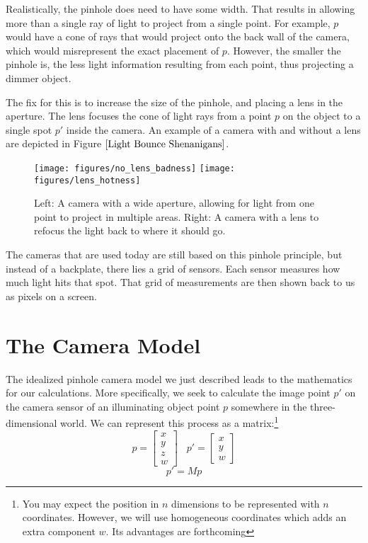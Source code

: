 \documentclass[
    12pt,
    twoside,
    bibstyle=chicago,
    headerstyle=uppercase,
	bibfile=biblatex_updating.bib
]{reedthesis}
\begin{document}
Realistically, the pinhole does need to have some width. That results in allowing more than a single ray of light to project from a single point. For example, $p$ would have a cone of rays that would project onto the back wall of the camera, which would misrepresent the exact placement of $p$. However, the smaller the pinhole is, the less light information resulting from each point, thus projecting a dimmer object.

The fix for this is to increase the size of the pinhole, and placing a lens in the aperture. The lens focuses the cone of light rays from a point $p$ on the object to a single spot $p'$ inside the camera. An example of a camera with and without a lens are depicted in Figure $\ref{Light Bounce Shenanigans}$. 



\begin{figure}[t]
	    \centering
	    \texttt{[image: figures/no\_lens\_badness]}
		\hfill
		\texttt{[image: figures/lens\_hotness]}
	    \caption{Left: A camera with a wide aperture, allowing for light from one point to project in multiple areas. Right: A camera with a lens to refocus the light back to where it should go.}
	\label{Light Bounce Shenanigans}
	\end{figure}


The cameras that are used today are still based on this pinhole principle, but instead of a backplate, there lies a grid of sensors. Each sensor measures how much light hits that spot. That grid of measurements are then shown back to us as pixels on a screen.


\section{The Camera Model}

The idealized pinhole camera model we just described leads to the mathematics for our calculations. More specifically, we seek to calculate the image point $p'$ on the camera sensor of an illuminating object point $p$ somewhere in the three-dimensional world. We can represent this process as a matrix:\footnote{You may expect the position in $n$ dimensions to be represented with $n$ coordinates. However, we will use homogeneous coordinates which adds an extra component $w$. Its advantages are forthcoming}
\[p = \left[\begin{smallmatrix}
	x\\y\\z\\w
\end{smallmatrix}\right] \;\;\; p' = \left[\begin{smallmatrix}
	x\\y\\w
\end{smallmatrix}\right]\]
\[p' = Mp\]
\end{document}
